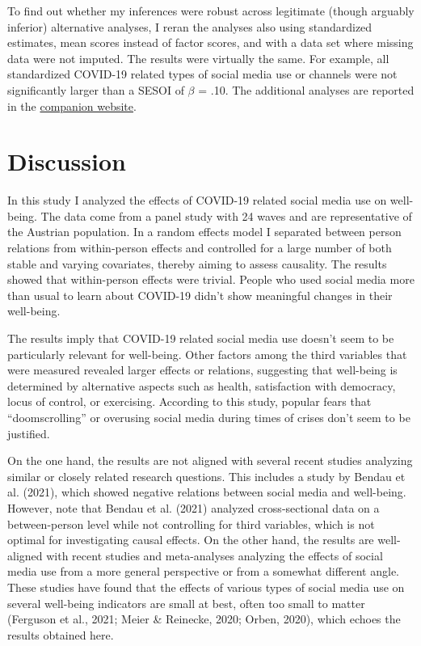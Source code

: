 \documentclass[
  english,
  man,floatsintext]{apa6}
\begin{document}
To find out whether my inferences were robust across legitimate (though arguably inferior) alternative analyses, I reran the analyses also using standardized estimates, mean scores instead of factor scores, and with a data set where missing data were not imputed.
The results were virtually the same.
For example, all standardized COVID-19 related types of social media use or channels were not significantly larger than a SESOI of \(\beta\) = \textbar.10\textbar.
The additional analyses are reported in the \href{https://tdienlin.github.io/Austrian_Corona_Panel/analyses_additional.html}{companion website}.

\hypertarget{discussion}{%
\section{Discussion}\label{discussion}}

In this study I analyzed the effects of COVID-19 related social media use on well-being.
The data come from a panel study with 24 waves and are representative of the Austrian population.
In a random effects model I separated between person relations from within-person effects and controlled for a large number of both stable and varying covariates, thereby aiming to assess causality.
The results showed that within-person effects were trivial.
People who used social media more than usual to learn about COVID-19 didn't show meaningful changes in their well-being.

The results imply that COVID-19 related social media use doesn't seem to be particularly relevant for well-being.
Other factors among the third variables that were measured revealed larger effects or relations, suggesting that well-being is determined by alternative aspects such as health, satisfaction with democracy, locus of control, or exercising.
According to this study, popular fears that ``doomscrolling'' or overusing social media during times of crises don't seem to be justified.

On the one hand, the results are not aligned with several recent studies analyzing similar or closely related research questions.
This includes a study by Bendau et al. (2021), which showed negative relations between social media and well-being.
However, note that Bendau et al. (2021) analyzed cross-sectional data on a between-person level while not controlling for third variables, which is not optimal for investigating causal effects.
On the other hand, the results are well-aligned with recent studies and meta-analyses analyzing the effects of social media use from a more general perspective or from a somewhat different angle.
These studies have found that the effects of various types of social media use on several well-being indicators are small at best, often too small to matter (Ferguson et al., 2021; Meier \& Reinecke, 2020; Orben, 2020), which echoes the results obtained here.
\end{document}
